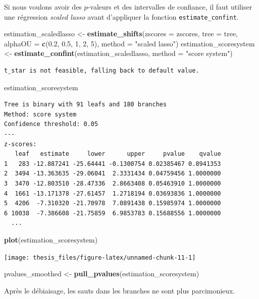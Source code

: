 \documentclass[12pt,a4paper]{reedthesis}
\newenvironment{Shaded}{\begin{snugshade}}{\end{snugshade}}
\newcommand{\DataTypeTok}[1]{\textcolor[rgb]{0.13,0.29,0.53}{#1}}
\newcommand{\DecValTok}[1]{\textcolor[rgb]{0.00,0.00,0.81}{#1}}
\newcommand{\FloatTok}[1]{\textcolor[rgb]{0.00,0.00,0.81}{#1}}
\newcommand{\KeywordTok}[1]{\textcolor[rgb]{0.13,0.29,0.53}{\textbf{#1}}}
\newcommand{\NormalTok}[1]{#1}
\newcommand{\StringTok}[1]{\textcolor[rgb]{0.31,0.60,0.02}{#1}}
\theoremstyle{definition}
\theoremstyle{definition}
\theoremstyle{definition}
\theoremstyle{remark}
\begin{document}
Si nous voulons avoir des \(p\)-valeurs et des intervalles de confiance, il faut utiliser une régression \emph{scaled lasso} avant d'appliquer la fonction \texttt{estimate\_confint}.
\begin{Shaded}
\begin{Highlighting}[]
\NormalTok{estimation_scaledlasso <-}\StringTok{ }
\StringTok{  }\KeywordTok{estimate_shifts}\NormalTok{(}\DataTypeTok{zscores =}\NormalTok{ zscores,}
                  \DataTypeTok{tree =}\NormalTok{ tree, }\DataTypeTok{alphaOU =} \KeywordTok{c}\NormalTok{(}\FloatTok{0.2}\NormalTok{, }\FloatTok{0.5}\NormalTok{, }\DecValTok{1}\NormalTok{, }\DecValTok{2}\NormalTok{, }\DecValTok{5}\NormalTok{),}
                  \DataTypeTok{method =} \StringTok{"scaled lasso"}\NormalTok{)}
\NormalTok{estimation_scoresystem <-}\StringTok{ }
\StringTok{  }\KeywordTok{estimate_confint}\NormalTok{(estimation_scaledlasso, }
                   \DataTypeTok{method =} \StringTok{"score system"}\NormalTok{)}
\end{Highlighting}
\end{Shaded}
\begin{verbatim}
t_star is not feasible, falling back to default value.
\end{verbatim}
\begin{Shaded}
\begin{Highlighting}[]
\NormalTok{estimation_scoresystem}
\end{Highlighting}
\end{Shaded}
\begin{verbatim}
Tree is binary with 91 leafs and 180 branches
Method: score system 
Confidence threshold: 0.05 
---
z-scores:
   leaf   estimate     lower      upper     pvalue    qvalue
1   283 -12.887241 -25.64441 -0.1300754 0.02385467 0.8941353
2  3494 -13.363635 -29.06041  2.3331434 0.04759456 1.0000000
3  3470 -12.803510 -28.47336  2.8663408 0.05463910 1.0000000
4  1661 -13.171378 -27.61457  1.2718194 0.03693836 1.0000000
5  4206  -7.310320 -21.70978  7.0891438 0.15985974 1.0000000
6 10038  -7.386608 -21.75859  6.9853783 0.15688556 1.0000000
  ...
\end{verbatim}
\begin{Shaded}
\begin{Highlighting}[]
\KeywordTok{plot}\NormalTok{(estimation_scoresystem)}
\end{Highlighting}
\end{Shaded}
\begin{center}\texttt{[image: thesis\_files/figure-latex/unnamed-chunk-11-1]} \end{center}
\begin{Shaded}
\begin{Highlighting}[]
\NormalTok{pvalues_smoothed <-}\StringTok{ }\KeywordTok{pull_pvalues}\NormalTok{(estimation_scoresystem)}
\end{Highlighting}
\end{Shaded}
Après le débiaisage, les sauts dans les branches ne sont plus parcimonieux.
\end{document}

